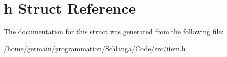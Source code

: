 \hypertarget{structitem_1_1h}{\section{h Struct Reference}
\label{structitem_1_1h}
}


The documentation for this struct was generated from the following file\-:\begin{DoxyCompactItemize}
\item 
/home/germain/programmation/\-Schlanga/\-Code/src/item.\-h\end{DoxyCompactItemize}
